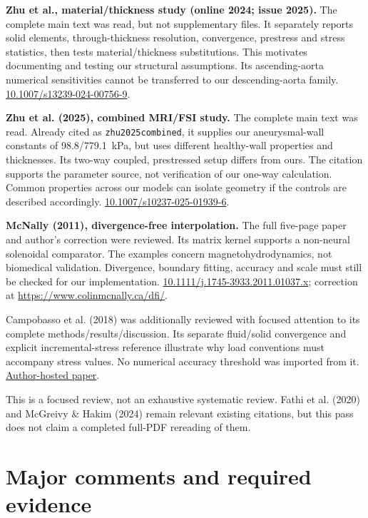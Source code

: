\documentclass[11pt,a4paper]{article}
\begin{document}
\textbf{Zhu et al., material/thickness study (online 2024; issue 2025).} The complete main text was read, but not supplementary files. It separately reports solid elements, through-thickness resolution, convergence, prestress and stress statistics, then tests material/thickness substitutions. This motivates documenting and testing our structural assumptions. Its ascending-aorta numerical sensitivities cannot be transferred to our descending-aorta family. \href{https://doi.org/10.1007/s13239-024-00756-9}{10.1007/s13239-024-00756-9}.

\textbf{Zhu et al. (2025), combined MRI/FSI study.} The complete main text was read. Already cited as \texttt{zhu2025combined}, it supplies our aneurysmal-wall constants of 98.8/779.1~kPa, but uses different healthy-wall properties and thicknesses. Its two-way coupled, prestressed setup differs from ours. The citation supports the parameter source, not verification of our one-way calculation. Common properties across our models can isolate geometry if the controls are described accordingly. \href{https://doi.org/10.1007/s10237-025-01939-6}{10.1007/s10237-025-01939-6}.

\textbf{McNally (2011), divergence-free interpolation.} The full five-page paper and author's correction were reviewed. Its matrix kernel supports a non-neural solenoidal comparator. The examples concern magnetohydrodynamics, not biomedical validation. Divergence, boundary fitting, accuracy and scale must still be checked for our implementation. \href{https://doi.org/10.1111/j.1745-3933.2011.01037.x}{10.1111/j.1745-3933.2011.01037.x}; correction at \url{https://www.colinmcnally.ca/dfi/}.

Campobasso et al. (2018) was additionally reviewed with focused attention to its complete methods/results/discussion. Its separate fluid/solid convergence and explicit incremental-stress reference illustrate why load conventions must accompany stress values. No numerical accuracy threshold was imported from it. \href{https://www.emse.fr/~avril/ART/ART118.pdf}{Author-hosted paper}.

This is a focused review, not an exhaustive systematic review. Fathi et al. (2020) and McGreivy \& Hakim (2024) remain relevant existing citations, but this pass does not claim a completed full-PDF rereading of them.

\section{Major comments and required evidence}
\end{document}
